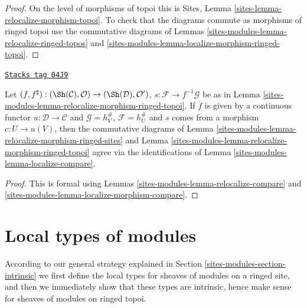 \begin{proof}
On the level of morphisms of topoi this is
Sites, Lemma \ref{sites-lemma-relocalize-morphism-topoi}.
To check that the diagrams commute as morphisms of ringed topoi use
the commutative diagrams of
Lemmas \ref{sites-modules-lemma-relocalize-ringed-topos} and
\ref{sites-modules-lemma-localize-morphism-ringed-topoi}.
\end{proof}

\begin{lemma}
\label{sites-modules-lemma-relocalize-morphism-compare}
\href{https://stacks.math.columbia.edu/tag/04J9}{\texttt{Stacks tag 04J9}}

Let
$(f, f^\sharp) :
(\Sh(\mathcal{C}), \mathcal{O})
\to
(\Sh(\mathcal{D}), \mathcal{O}')$,
$s : \mathcal{F} \to f^{-1}\mathcal{G}$ be as in
Lemma \ref{sites-modules-lemma-relocalize-morphism-ringed-topoi}.
If $f$ is given by a continuous functor
$u : \mathcal{D} \to \mathcal{C}$
and $\mathcal{G} = h_V^\#$,
$\mathcal{F} = h_U^\#$ and $s$ comes from a morphism
$c : U \to u(V)$, then
the commutative diagrams of
Lemma \ref{sites-modules-lemma-relocalize-morphism-ringed-sites}
and
Lemma \ref{sites-modules-lemma-relocalize-morphism-ringed-topoi}
agree via the identifications of
Lemma \ref{sites-modules-lemma-localize-compare}.
\end{lemma}

\begin{proof}
This is formal using
Lemmas \ref{sites-modules-lemma-relocalize-compare} and
\ref{sites-modules-lemma-localize-morphism-compare}.
\end{proof}

\section{Local types of modules}
\label{sites-modules-section-local}
According to our general strategy explained in Section \ref{sites-modules-section-intrinsic}
we first define the local types for sheaves of modules on a ringed site, and
then we immediately show that these types are intrinsic, hence make sense
for sheaves of modules on ringed topoi.

